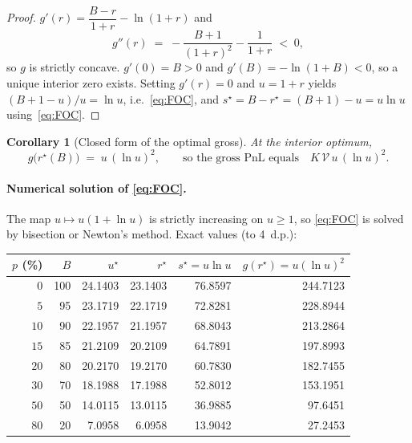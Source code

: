 \documentclass[11pt,a4paper]{article}
\newtheorem{corollary}[proposition]{Corollary}
\theoremstyle{definition}
\theoremstyle{remark}
\newcommand{\Sp}{\mathcal{V}}
\begin{document}
\begin{proof}
\(g'(r)=\dfrac{B-r}{1+r}-\ln(1+r)\) and
\[
g''(r)\;=\;-\frac{B+1}{(1+r)^2}-\frac{1}{1+r}\;<\;0,
\]
so \(g\) is strictly concave. \(g'(0)=B>0\) and \(g'(B)=-\ln(1+B)<0\), so a
unique interior zero exists. Setting \(g'(r)=0\) and \(u=1+r\) yields
\((B+1-u)/u=\ln u\), i.e.\ \eqref{eq:FOC}, and \(s^\star=B-r^\star=(B+1)-u=u\ln u\)
using~\eqref{eq:FOC}.
\end{proof}

\begin{corollary}[Closed form of the optimal gross]\label{cor:innergross}
At the interior optimum,
\begin{equation}\label{eq:innergross}
g\bigl(r^\star(B)\bigr)\;=\;u\,(\ln u)^2,\qquad
\text{so the gross PnL equals}\quad K\,\Sp\,u\,(\ln u)^2.
\end{equation}
\end{corollary}

\paragraph{Numerical solution of \eqref{eq:FOC}.}
The map \(u\mapsto u(1+\ln u)\) is strictly increasing on \(u\ge 1\), so
\eqref{eq:FOC} is solved by bisection or Newton's method. Exact values (to 4~d.p.):

\begin{center}
\renewcommand{\arraystretch}{1.12}
\begin{tabular}{r r r r r r}
\toprule
\(p\) (\%) & \(B\) & \(u^\star\) & \(r^\star\) & \(s^\star=u\ln u\) & \(g(r^\star)=u(\ln u)^2\) \\
\midrule
\(0\)  & 100 & 24.1403 & 23.1403 & 76.8597 & 244.7123 \\
\(5\)  & 95  & 23.1719 & 22.1719 & 72.8281 & 228.8944 \\
\(10\) & 90  & 22.1957 & 21.1957 & 68.8043 & 213.2864 \\
\(15\) & 85  & 21.2109 & 20.2109 & 64.7891 & 197.8993 \\
\(20\) & 80  & 20.2170 & 19.2170 & 60.7830 & 182.7455 \\
\(30\) & 70  & 18.1988 & 17.1988 & 52.8012 & 153.1951 \\
\(50\) & 50  & 14.0115 & 13.0115 & 36.9885 & \phantom{0}97.6451 \\
\(80\) & 20  & \phantom{0}7.0958 & \phantom{0}6.0958 & 13.9042 & \phantom{0}27.2453 \\
\bottomrule
\end{tabular}
\end{center}
\end{document}
